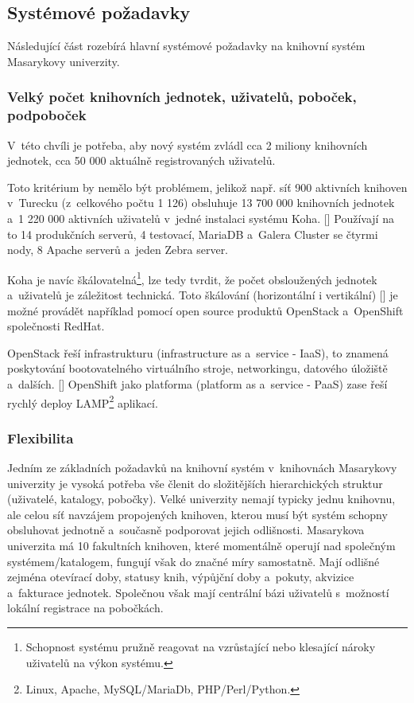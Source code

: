 \documentclass[
	11pt, oneside, printed, final, palatino, monochrome
	microtype,
	table,   %
	lof,     %
	lot     %
]{fithesis3}
\newcommand{\citepages}[2]{[\cite[#1]{#2}]}
\newcommand{\citesource}[1]{[\cite{#1}]}
\begin{document}
{\subsection{Systémové požadavky} \label{sec:systemove_pozadavky}
Následující část rozebírá hlavní systémové požadavky na knihovní systém Masarykovy univerzity.

\subsubsection{Velký počet knihovních jednotek, uživatelů, poboček, podpoboček}
V~této chvíli je potřeba, aby nový systém zvládl cca 2 miliony knihovních jednotek, cca 50 000 aktuálně registrovaných  uživatelů.

Toto kritérium by nemělo být problémem, jelikož např. síť 900 aktivních knihoven v~Turecku (z~celkového počtu 1 126) obsluhuje 13 700 000 knihovních jednotek a~1 220 000 aktivních uživatelů v~jedné instalaci systému Koha. \citesource{koha_komunita_2016}
 Používají na to 14 produkčních serverů, 4 testovací, MariaDB a~Galera Cluster se čtyrmi nody, 8 Apache serverů a~jeden Zebra server. 

Koha je navíc škálovatelná\footnote{Schopnost systému pružně reagovat na vzrůstající nebo klesající nároky uživatelů na výkon systému.}, lze tedy tvrdit, že počet obsloužených jednotek a~uživatelů je záležitost technická. Toto škálování (horizontální i vertikální) \citepages{1-4}{6847479} je možné provádět například pomocí open source produktů OpenStack a~OpenShift společnosti RedHat. 

OpenStack řeší infrastrukturu (infrastructure as a~service - IaaS), to znamená poskytování bootovatelného virtuálního stroje, networkingu, datového úložiště a~dalších. \citepages{14-16}{breeding_2012} OpenShift jako platforma (platform as a~service - PaaS) zase řeší rychlý deploy LAMP\footnote{Linux, Apache, MySQL/MariaDb, PHP/Perl/Python.} aplikací.

\subsubsection{Flexibilita}
Jedním ze základních požadavků na knihovní systém v~knihovnách Masarykovy univerzity je vysoká potřeba vše členit do složitějších hierarchických struktur (uživatelé, katalogy, pobočky). Velké univerzity nemají typicky jednu knihovnu, ale celou síť navzájem propojených knihoven, kterou musí být systém schopny obsluhovat jednotně a~současně podporovat jejich odlišnosti. Masarykova univerzita má 10 fakultních knihoven, které momentálně operují nad společným systémem/katalogem, fungují však do značné míry samostatně. Mají odlišné zejména otevírací doby, statusy knih, výpůjční doby a~pokuty, akvizice a~fakturace jednotek. Společnou však mají centrální bázi uživatelů s~možností lokální registrace na pobočkách. 

}
\end{document}
